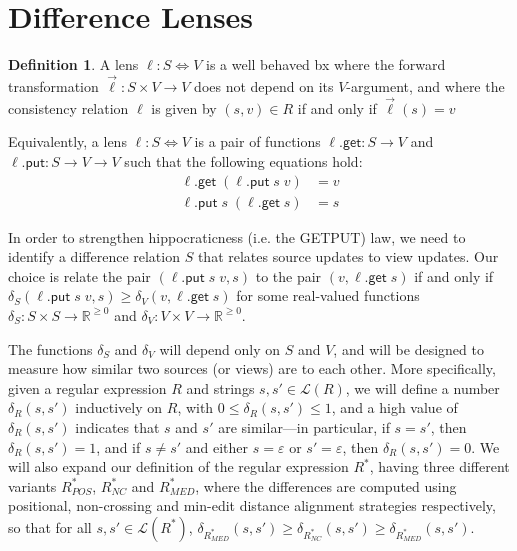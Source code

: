 \documentclass[acmsmall,review,anonymous]{acmart}\settopmatter{printfolios=true,printccs=false,printacmref=false}
\theoremstyle{definition}
\newtheorem{definition}{Definition}
\newcommand{\kw}[1]{\ensuremath{\mathsf{#1}}\xspace}
\newcommand{\get}{\ensuremath{\kw{get}}\xspace}
\newcommand{\pput}{\ensuremath{\kw{put}}\xspace}
\begin{document}
\section{Difference Lenses}
\begin{definition}
A lens $\ell : S \Leftrightarrow V$ is a well behaved bx where the forward transformation $\overrightarrow{\ell} : S \times V \longrightarrow V$ does not depend on its $V$-argument, and where the consistency relation $\ell$ is given by $(s, v) \in R$ if and only if $\overrightarrow{\ell}(s) = v$

Equivalently, a lens $\ell : S \Leftrightarrow V$ is a pair of functions $\ell.\get : S \longrightarrow V$ and $\ell.\pput : S \longrightarrow V \longrightarrow V$ such that the following equations hold:
\begin{align*}
\ell.\get \; (\ell.\pput \; s \; v) &= v \tag{PUTGET}\\
\ell.\pput \; s \; (\ell.\get \; s) &= s \tag{GETPUT}
\end{align*}
\end{definition}
In order to strengthen hippocraticness (i.e. the GETPUT) law, we need to identify a difference relation $S$ that relates source updates to view updates. Our choice is relate the pair $(\ell.\pput \; s \; v, s)$ to the pair $(v, \ell.\get \; s)$ if and only if $\delta_S(\ell.\pput \; s \; v, s) \geq \delta_V(v, \ell.\get \; s)$ for some real-valued functions $\delta_S : S \times S \longrightarrow \mathbb{R}^{\geq 0}$ and $\delta_V : V \times V \longrightarrow \mathbb{R}^{\geq 0}$.

The functions $\delta_S$ and $\delta_V$ will depend only on $S$ and $V$, and will be designed to measure how similar two sources (or views) are to each other. More specifically, given a regular expression $R$ and strings $s, s' \in \mathcal{L}(R)$, we will define a number $\delta_R(s, s')$ inductively on $R$, with $0 \leq \delta_R(s, s') \leq 1$, and a high value of $\delta_R(s, s')$ indicates that $s$ and $s'$ are similar---in particular, if $s = s'$, then $\delta_R(s, s') = 1$, and if $s \neq s'$ and either $s = \varepsilon$ or $s' = \varepsilon$, then $\delta_R(s, s') = 0$. We will also expand our definition of the regular expression $R^*$, having three different variants $R^*_{POS}$, $R^*_{NC}$ and $R^*_{MED}$, where the differences are computed using positional, non-crossing and min-edit distance alignment strategies respectively, so that for all $s, s' \in \mathcal{L}(R^*)$, $\delta_{R^*_{MED}}(s, s') \geq \delta_{R^*_{NC}}(s, s') \geq \delta_{R^*_{MED}}(s, s')$.
\end{document}
